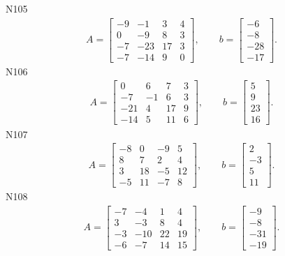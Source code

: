 \documentclass[11pt]{report}
\begin{document}
N105
\begin{align*}
 A = \left[\begin{matrix}-9 & -1 & 3 & 4\\0 & -9 & 8 & 3\\-7 & -23 & 17 & 3\\-7 & -14 & 9 & 0\end{matrix}\right],
\qquad b = \left[\begin{matrix}-6\\-8\\-28\\-17\end{matrix}\right]. 
 \end{align*}
N106
\begin{align*}
 A = \left[\begin{matrix}0 & 6 & 7 & 3\\-7 & -1 & 6 & 3\\-21 & 4 & 17 & 9\\-14 & 5 & 11 & 6\end{matrix}\right],
\qquad b = \left[\begin{matrix}5\\9\\23\\16\end{matrix}\right]. 
 \end{align*}
N107
\begin{align*}
 A = \left[\begin{matrix}-8 & 0 & -9 & 5\\8 & 7 & 2 & 4\\3 & 18 & -5 & 12\\-5 & 11 & -7 & 8\end{matrix}\right],
\qquad b = \left[\begin{matrix}2\\-3\\5\\11\end{matrix}\right]. 
 \end{align*}
N108
\begin{align*}
 A = \left[\begin{matrix}-7 & -4 & 1 & 4\\3 & -3 & 8 & 4\\-3 & -10 & 22 & 19\\-6 & -7 & 14 & 15\end{matrix}\right],
\qquad b = \left[\begin{matrix}-9\\-8\\-31\\-19\end{matrix}\right]. 
 \end{align*}
\end{document}
